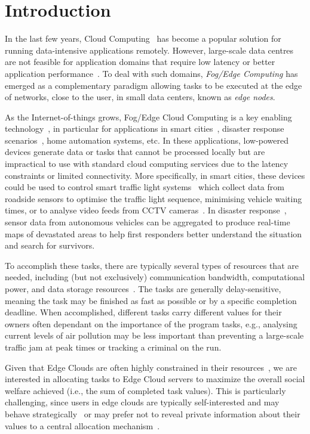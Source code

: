 \section{Introduction}
\label{sec:introduction}
In the last few years, Cloud Computing~\cite{cloud_cite} has become a popular solution for running data-intensive
applications remotely. However, large-scale data centres are not feasible for application domains that require low
latency or better application performance~\cite{mobile_edge_IoT}. To deal with such domains, \emph{Fog/Edge Computing}
has emerged as a complementary paradigm allowing tasks to be executed at the edge of networks, close to the user, in
small data centers, known as \emph{edge nodes}.

As the Internet-of-things grows, Fog/Edge Cloud Computing is a key enabling
technology~\cite{mobile_edge_IoT, edge_computing_iot}, in particular for applications
in smart cities~\cite{mobile_edge_smart}, disaster response scenarios~\cite{mobile_edge_disaster, smart_disaster_management},
home automation systems, etc. In these applications, low-powered devices generate data or tasks that cannot be
processed locally but are impractical to use with standard cloud computing services due to the latency constraints or
limited connectivity. More specifically, in smart cities,
these devices could be used to control smart traffic light systems~\cite{smart_cities_traffic_lights} which collect
data from roadside sensors to optimise the traffic light sequence, minimising vehicle waiting times, or to analyse
video feeds from CCTV cameras~\cite{Sreenu2019}. In disaster response~\cite{smart_disaster_management}, sensor data
from autonomous vehicles can be aggregated to produce real-time maps of devastated areas to help first responders better
understand the situation and search for survivors.

To accomplish these tasks, there are typically several types of resources that are needed, including (but not exclusively)
communication bandwidth, computational power, and data storage resources~\cite{vaji_infocom}. The tasks are
generally delay-sensitive, meaning the task may be finished as fast as possible or by a specific completion deadline.
When accomplished, different tasks carry different values for their owners often dependant on the importance of the
program tasks, e.g., analysing current levels of air pollution may be less important than preventing a large-scale
traffic jam at peak times or tracking a criminal on the run.

Given that Edge Clouds are often highly constrained in their resources~\cite{edge_limitations}, we are interested in
allocating tasks to Edge Cloud servers to maximize the overall social welfare achieved (i.e., the sum of completed task
values). This is particularly challenging, since users in edge clouds are typically self-interested and may behave
strategically~\cite{Bi2019} or may prefer not to reveal private information about their values to a central allocation
mechanism~\cite{Pai2013}.

